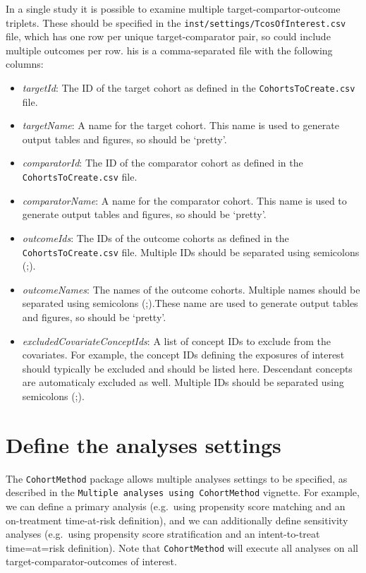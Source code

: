 \documentclass[]{article}
\providecommand{\tightlist}{%
  \setlength{\itemsep}{0pt}\setlength{\parskip}{0pt}}
\begin{document}
In a single study it is possible to examine multiple
target-compartor-outcome triplets. These should be specified in the
\texttt{inst/settings/TcosOfInterest.csv} file, which has one row per
unique target-comparator pair, so could include multiple outcomes per
row. his is a comma-separated file with the following columns:

\begin{itemize}
\tightlist
\item
  \emph{targetId}: The ID of the target cohort as defined in the
  \texttt{CohortsToCreate.csv} file.
\item
  \emph{targetName}: A name for the target cohort. This name is used to
  generate output tables and figures, so should be `pretty'.
\item
  \emph{comparatorId}: The ID of the comparator cohort as defined in the
  \texttt{CohortsToCreate.csv} file.
\item
  \emph{comparatorName}: A name for the comparator cohort. This name is
  used to generate output tables and figures, so should be `pretty'.
\item
  \emph{outcomeIds}: The IDs of the outcome cohorts as defined in the
  \texttt{CohortsToCreate.csv} file. Multiple IDs should be separated
  using semicolons (;).
\item
  \emph{outcomeNames}: The names of the outcome cohorts. Multiple names
  should be separated using semicolons (;).These name are used to
  generate output tables and figures, so should be `pretty'.
\item
  \emph{excludedCovariateConceptIds}: A list of concept IDs to exclude
  from the covariates. For example, the concept IDs defining the
  exposures of interest should typically be excluded and should be
  listed here. Descendant concepts are automaticaly excluded as well.
  Multiple IDs should be separated using semicolons (;).
\end{itemize}

\hypertarget{define-the-analyses-settings}{%
\section{Define the analyses
settings}\label{define-the-analyses-settings}}

The \texttt{CohortMethod} package allows multiple analyses settings to
be specified, as described in the
\texttt{Multiple\ analyses\ using\ CohortMethod} vignette. For example,
we can define a primary analysis (e.g.~using propensity score matching
and an on-treatment time-at-risk definition), and we can additionally
define sensitivity analyses (e.g.~using propensity score stratification
and an intent-to-treat time=at=risk definition). Note that
\texttt{CohortMethod} will execute all analyses on all
target-comparator-outcomes of interest.
\end{document}
